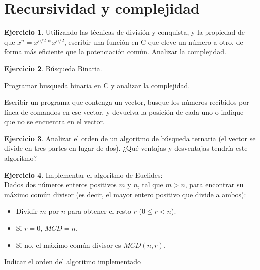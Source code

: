 \documentclass[11pt,a4paper]{article}
\theoremstyle{definition}
\newtheorem{ejercicio}{Ejercicio}[section]
\begin{document}
\newpage
\section{Recursividad y complejidad}

\begin{ejercicio}
Utilizando las técnicas de división y conquista, y la propiedad de que $x^n
= x^{n/2}*x^{n/2}$, escribir una función en C que eleve un número a otro, de
forma más eficiente que la potenciación común.  Analizar la complejidad.
\end{ejercicio}

\begin{ejercicio}
Búsqueda Binaria.
\begin{partes}
\item Programar busqueda binaria en C y analizar la complejidad.
\item Escribir un programa que contenga un vector, busque los números
recibidos por línea de comandos en ese vector, y devuelva la posición de cada
uno o indique que no se encuentra en el vector.
\end{partes}
\end{ejercicio}

\begin{ejercicio}
Analizar el orden de un algoritmo de búsqueda ternaria (el vector se divide en
tres partes en lugar de dos). ¿Qué ventajas y desventajas tendría este
algoritmo?
\end{ejercicio}

\begin{ejercicio}
Implementar el algoritmo de Euclides: \\
Dados dos números enteros positivos $m$ y $n$, tal que $m > n$,
para encontrar su máximo común divisor (es decir, el mayor entero positivo que divide a ambos):
\begin{itemize}
\item Dividir $m$ por $n$ para obtener el resto $r$ ($0 \leq r < n$).
\item Si $r = 0$, $MCD=n$.
\item Si no, el máximo común divisor es $MCD(n,r)$.
\end{itemize}
Indicar el orden del algoritmo implementado
\end{ejercicio}
\end{document}
